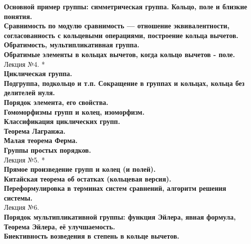 \documentclass[12pt]{article}
\begin{document}
\textbf{Основной пример группы: симметрическая группа. Кольцо, поле и близкие понятия.}\\

\textbf{Сравнимость по модулю сравнимость — отношение эквивалентности, согласованность с кольцевыми операциями, построение кольца вычетов.}\\

\textbf{Обратимость, мультипликативная группа.}\\

\textbf{Обратимые элементы в кольцах вычетов, когда кольцо вычетов - поле.}\\

Лекция №4. *\\
\textbf{Циклическая группа.}\\

\textbf{Подгруппа, подкольцо и т.п. Сокращение в группах и кольцах, кольца без делителей нуля.}\\

\textbf{Порядок элемента, его свойства.}\\

\textbf{Гомоморфизмы групп и колец, изоморфизм.}\\

\textbf{Классификация циклических групп.}\\

\textbf{Теорема Лагранжа.}\\

\textbf{Малая теорема Ферма.}\\

\textbf{Группы простых порядков.}\\

Лекция №5. *\\
\textbf{Прямое произведение групп и колец (и полей).}\\

\textbf{Китайская теорема об остатках (кольцевая версия).}\\

\textbf{Переформулировка в терминах систем сравнений, алгоритм решения системы.}\\

Лекция №6.\\
\textbf{Порядок мультипликативной группы: функция Эйлера, явная формула, Теорема Эйлера, её улучшаемость.}\\

\textbf{Биективность возведения в степень в кольце вычетов.}\\
\end{document}
